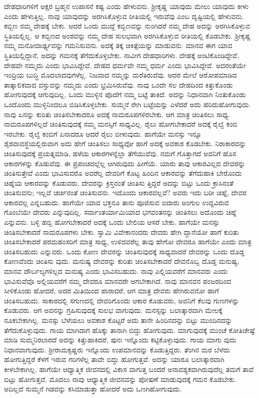 ದೇಹಧಾರಿಗಳಿಗೆ ಅಕ್ಷರ ಬ್ರಹ್ಮನ ಉಪಾಸನೆ ಕಷ್ಟ ಎಂದು ಹೇಳುವನು. ಶ್ರೀಕೃಷ್ಣ ಯಾವುದು ಮೇಲು ಯಾವುದು ಕೀಳು ಎಂದು ಹೇಳುತ್ತಿಲ್ಲ. ನಾವು ಯಾವುದನ್ನು ಅರಗಿಸಿಕೊಳ್ಳುವ ರೀತಿಯಲ್ಲಿ ಇರುವೆವು ಎಂಬ ದೃಷ್ಟಿಯಲ್ಲಿ ಹೇಳುವನು. ಕಬ್ಬಿಣ ನಮ್ಮ ದೇಹಕ್ಕೆ ಬೇಕು. ಆದರೆ ಒಂದು ಮುದ್ದೆ ಕಬ್ಬಿಣವನ್ನು ನುಂಗಿದರೆ ನಮ್ಮ ದೇಹ ಅದನ್ನು ಅರಗಿಸಿಕೊಳ್ಳುವ ಸ್ಥಿತಿಯಲ್ಲಿಲ್ಲ. ಆ ಕಬ್ಬಿಣದ ಅಂಶವನ್ನು ನಮ್ಮ ದೇಹ ಸುಲಭವಾಗಿ ಅರಗಿಸಿಕೊಳ್ಳುವ ರೀತಿಯಲ್ಲಿ ಕೊಡಬೇಕು. ಶ್ರೀಕೃಷ್ಣ ನಮ್ಮ ಮನೋದಾರ್ಢ್ಯವನ್ನು ಗಮನಿಸುವನು. ಅದಕ್ಕೆ ತಕ್ಕ ಚಿಕಿತ್ಸೆಯನ್ನು ಮಾಡುವನು. ಮಾನವ ಈಗ ಯಾವ ಸ್ಥಿತಿಯಲ್ಲಿದ್ದಾನೆ, ಅದನ್ನು ಗಮನಕ್ಕೆ ತೆಗೆದುಕೊಳ್ಳಬೇಕು. ನಾವೀಗ ದೇಹಧಾರಿಗಳು. ದೇಹಕ್ಕೆ ಅಂಟಿಕೊಂಡಿದ್ದೇವೆ, ದೇಹವೇ ನಮ್ಮದು ಎಂದು ಭಾವಿಸಿದ್ದೇವೆ. ದೇಹದ ಧರ್ಮವೇ ನಮ್ಮ ಧರ್ಮ ಎಂದು ಭಾವಿಸಿದ್ದೇವೆ. ಅದರಂತೆಯೇ ಇಂದ್ರಿಯ ಬುದ್ಧಿ ಮೊದಲಾದವುಗಳೆಲ್ಲ. ನಿಜವಾದ ನಮ್ಮನ್ನು ಮರೆತಿರುವೆವು. ಅದರ ಮೇಲೆ ಆರೋಪಮಾಡಿದ ತಾತ್ಕಾಲಿಕವಾದ ವಸ್ತುವನ್ನು ನಮ್ಮದು ಎಂದು ಭ್ರಮಿಸಿರುವೆವು. ನಾವು ಒಂದೇ ಸಲ ದೇಹದಿಂದ ಕಿತ್ತುಕೊಂಡು ಹೋಗುವುದಕ್ಕೆ ಆಗುವುದಿಲ್ಲ. ಒಂದು ಮುಳ್ಳಿನ ಪೊದೆಗೆ ನಮ್ಮ ಬಟ್ಟೆ ತಾಕಿದೆ. ಅದನ್ನು ನಿಧಾನವಾಗಿ ನಿಂತುಕೊಂಡು ಒಂದೊಂದು ಮುಳ್ಳಿನಿಂದಲೂ ಬಿಡಿಸಿಕೊಳ್ಳಬೇಕು. ಸುಮ್ಮನೆ ರೇಗಿ ಬಟ್ಟೆಯನ್ನು ಎಳೆದರೆ ಅದು ಹರಿದುಹೋಗುವುದು. ನಾವು ಏನನ್ನು ಕುರಿತು ಚಿಂತಿಸಬೇಕಾದರೂ ಅದಕ್ಕೆ ನಾಮರೂಪಗಳಿರಬೇಕು. ಆಗ ಮಾತ್ರ ಚಿಂತಿಸಲು ಸಾಧ್ಯ. ನಾಮರೂಪಗಳಿಲ್ಲದೆ ಚಿಂತಿಸುವುದಕ್ಕೆ ನಮ್ಮ ಮನಸ್ಸಿಗೆ ಸಾಧ್ಯವಿಲ್ಲ. ರೈಲು ಹೋಗಬೇಕಾದರೆ ಅದಕ್ಕೆ ರೈಲ್ವೆ ಕಂಬಿ ಇರಬೇಕು. ರೈಲ್ವೆ ಕಂಬಿಗೆ ಏನಾದರೂ ಆದರೆ ರೈಲು ಬೀಳುವುದು. ಹಾಗೆಯೇ ಮನಸ್ಸು ಇನ್ನೂ ಶೈಶವಾವಸ್ಥೆಯಲ್ಲಿರುವಾಗ ಅದು ಹೇಗೆ ಚಿಂತಿಸಲು ಸಾಧ್ಯವೋ ಹಾಗೆ ಅದಕ್ಕೆ ಅವಕಾಶ ಕೊಡಬೇಕು. ನಿರಾಕಾರವನ್ನು ಚಿಂತಿಸುವುದಕ್ಕೆ ಪ್ರಯತ್ನಮಾಡಿ, ಹಳೆಯ ಆಕಾರಗಳನ್ನೆಲ್ಲಾ ತೆಗೆಯುವೆವು. ನಮಗೆ ಗೊತ್ತಾಗದೆ ಅವನಿಗೆ ಹೊಸ ಆಕಾರಗಳನ್ನು ಕೊಡುವೆವು. ಈ ಪ್ರಪಂಚದಲ್ಲೆಲ್ಲ ಆಗಿರುವುದು ಹೀಗೆಯೆ. ಯಾರು ತಾವು ಆಕಾರವಿಲ್ಲದ ದೇವರನ್ನು ಚಿಂತಿಸುತ್ತೇವೆ ಎಂದು ಭಾವಿಸುವರೊ ಅವರೆಲ್ಲ ದೇವರಿಗೆ ಕೊಟ್ಟ ಹಿಂದಿನ ಆಕಾರವನ್ನು ತೆಗೆದುಹಾಕಿ ಬೇರೊಂದು ಚಿಹ್ನೆಯ ಆಕಾರವನ್ನು ಕೊಡುವರು. ದೇವರನ್ನು ಕ್ರಿಸ್ತನಂತೆ ಚಿಂತಿಸು ತ್ತಿದ್ದರೆ ಅದನ್ನು ಬಿಟ್ಟು ಒಂದು ಕ್ರಾಸಿನಂತೆ ಚಿಂತಿಸುವನು; ಇಲ್ಲವೆ ಚರ್ಚಿನಂತೆ ಚಿಂತಿಸುವನು. ಇದೊಂದು ಆಕಾರವಲ್ಲವೆ? ಅವರು ಇದು ಬರೀ ಚಿಹ್ನೆ, ದೇವರ ಆಕಾರವಲ್ಲ ಎನ್ನಬಹುದು. ಹಾಗೆಯೇ ಯಾವ ಭಕ್ತನೂ ತಾನು ಪೂಜಿಸುವ ಐದಾರು ಅಂಗುಲ ಉದ್ದವಿರುವ ಗೊಂಬೆಯೇ ದೇವರು ಎನ್ನುವುದಿಲ್ಲ. ಸರ್ವಾಂತರ್ಯಾಮಿಯಾದ ಭಗವಂತನನ್ನು ಚಿಂತಿಸಲು ಅದೊಂದು ಚಿಹ್ನೆ ಎನ್ನುವನು. ಬಳ್ಳಿ ಹಬ್ಬಿ ಹೋಗಬೇಕಾದರೆ ಅದಕ್ಕೆ ಒಂದು ಬೇಲಿಯ ಆಸರೆ ಬೇಕು. ಹಾಗೆಯೇ ಮನಸ್ಸು ಚಿಂತಿಸಬೇಕಾದರೆ ನಾಮರೂಪಗಳು ಬೇಕು. ಸ್ವಾಮಿ ವಿವೇಕಾನಂದರು ದೇವರು ಹೇಗಿ ದ್ದಾನೆಯೋ ಹಾಗೆ ಕುರಿತು ಚಿಂತಿಸಬೇಕಾದರೆ ಪರಮಹಂಸರಿಗೆ ಮಾತ್ರ ಸಾಧ್ಯ, ಉಳಿದವರೆಲ್ಲ ತಾವು ಹೇಗೋ ದೇವರೂ ಹಾಗೆಯೇ ಎಂದು ಮಾತ್ರ ಚಿಂತಿಸಬಹುದು ಎನ್ನುವರು. ಒಂದು ಕೋಣ ದೇವರನ್ನು ಚಿಂತಿಸುವುದಕ್ಕೆ ಸಾಧ್ಯವಾದರೆ ದೇವರನ್ನು ಒಂದು ದೊಡ್ಡ ಕೋಣವೆಂದು ಚಿಂತಿಸು ವುದು. ಮನುಷ್ಯ ದೇವರನ್ನು ಕುರಿತು ಚಿಂತಿಸಬೇಕಾದರೆ ದೇವನೊಬ್ಬ ದೊಡ್ಡ ಮನುಷ್ಯ, ಮಾನವ ದೌರ್ಬಲ್ಯಗಳಿಲ್ಲದ ಮನುಷ್ಯ ಎಂದು ಭಾವಿಸಬಹುದು. ನಾವು ಎಲ್ಲಿಯವರೆಗೆ ಮಾನವರು ಎಂದು ಭಾವಿಸುವೆವೊ ಅಲ್ಲಿಯವರೆಗೆ ನಮ್ಮ ದೇವರೂ ಮಾನವರೇ ಆಗಬೇಕಾಗಿದೆ. ನಾವು ಮಾನವನ ಪಂಜರದಿಂದ ಸೀಳಿಕೊಂಡು ಹೋದರೆ, ಅದರ ಮಿತಿಯಿಂದ ಪಾರಾದರೆ, ಆಗ ಮಾತ್ರ ದೇವರು ಹೇಗಿರುವನೋ ಹಾಗೆ ಚಿಂತಿಸಬಹುದು. ಸಾಕಾರದಲ್ಲಿ ಸಗುಣದಲ್ಲಿ ದೇವರಿಗೊಂದು ಆಕಾರ ಕೊಡುವರು, ಅವನಿಗೆ ಕೆಲವು ಗುಣಗಳನ್ನು ಕೊಡುವರು. ಆಗ ಅವನನ್ನು ಗ್ರಹಿಸುವುದಕ್ಕೆ ಸುಲಭ ವಾಗುವುದು. ಮನಸ್ಸನ್ನು ಬಲಾತ್ಕಾರವಾಗಿ ಮೇಲಕ್ಕೆ ನೂಕಬೇಕಾಗಿಲ್ಲ. ಮನಸ್ಸು ಬೆಳೆಯಲು ಅವಕಾಶ ಕೊಟ್ಟರೆ ಅದು ತಾನೇ ಹಿಂದಿನದನ್ನು ಬಿಟ್ಟು ಮುಂದಿನದನ್ನು ತೆಗೆದುಕೊಳ್ಳುವುದು. ಗಾಯ ಮಾಗಿದಾಗ ಹೊಕ್ಕು ತಾನಾಗಿ ಬಿದ್ದು ಹೋಗುವುದು. ಮಾಗುವುದಕ್ಕೆ ಮುಂಚೆ ಕೋತಿಚೇಷ್ಟೆ ಮಾಡಿ ಸುಮ್ಮನಿರಲಾರದೆ ಅದನ್ನು ಕಿತ್ತುಹಾಕಿದರೆ, ಪುನಃ ಇನ್ನೊಂದು ಕಟ್ಟಿಕೊಳ್ಳುವುದು. ಗಾಯ ಮಾಗು ವುದು ನಿಧಾನವಾಗುವುದು. ಶ್ರೀರಾಮಕೃಷ್ಣರು ಇನ್ನೊಂದು ಉಪಮಾನವನ್ನು ಕೊಡುತ್ತಿದ್ದರು. ತೆಂಗಿನ ಮರ ಬೆಳೆದು ಹೋಗುತ್ತಿದ್ದರೆ ಕೆಳಗೆ ಇರುವ ಗರಿಗಳೆಲ್ಲ ತಾವೇ ಬಿದ್ದು ಹೋಗುತ್ತವೆ. ಅದನ್ನು ಯಾರೂ ಬಲಾತ್ಕಾರವಾಗಿ ಕೀಳಬೇಕಾಗಿಲ್ಲ. ಹಾಗೆಯೇ ಆಧ್ಯಾತ್ಮಿಕ ಜೀವನದಲ್ಲಿ ವಿಕಾಸ ವಾಗುತ್ತ ಬಂದರೆ ಅನಾವಶ್ಯಕವಾಗಿರುವುದೆಲ್ಲ ತಮಗೆ ತಾವೆ ಬಿಟ್ಟು ಹೋಗುತ್ತವೆ. ಮೊದಲು ನಾವು ಆಧ್ಯಾತ್ಮಿಕ ಜೀವನವನ್ನು ಪೋಷಣೆ ಮಾಡುವುದಕ್ಕೆ ಗಮನ ಕೊಡಬೇಕು. ಅದಿಲ್ಲದೆ ಸುಮ್ಮನೆ ಗಿಡವನ್ನು ಕಸಿಮಾಡುತ್ತಾ ಹೋದರೆ ಅದು ಒಣಗಿಹೋಗುವುದು. 